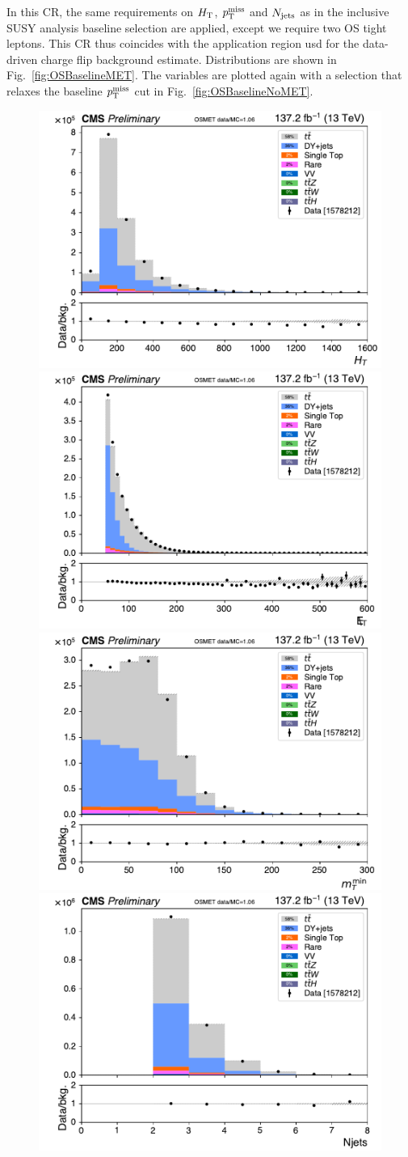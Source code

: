 In this CR, the same requirements on $H_{\mathrm{T}}$, $p_{\mathrm{T}}^\text{miss}$ and $N_\text{jets}$ as in the
inclusive SUSY analysis baseline selection are applied, except we require two
OS tight leptons. This CR thus coincides with the application region usd for
the data-driven charge flip background estimate. Distributions are shown in
Fig.~\ref{fig:OSBaselineMET}. The variables are plotted again with a
selection that relaxes the baseline $p_{\mathrm{T}}^\text{miss}$ cut in
Fig.~\ref{fig:OSBaselineNoMET}.

\begin{figure}[!htb]
\centering
\includegraphics[width=0.45\linewidth]{figs/ssan/cr/run2_osmet_ht_in.pdf} 
\includegraphics[width=0.45\linewidth]{figs/ssan/cr/run2_osmet_met_in.pdf} 
\includegraphics[width=0.45\linewidth]{figs/ssan/cr/run2_osmet_mtmin_in.pdf}
\includegraphics[width=0.45\linewidth]{figs/ssan/cr/run2_osmet_njets_in.pdf} 

\end{figure}
